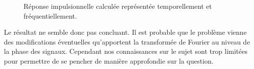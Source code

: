 \begin{figure}[h!]
\caption{\label{bizarre}Réponse impulsionnelle calculée représentée temporellement et fréquentiellement.}
\end{figure}
Le résultat ne semble donc pas concluant. Il est probable que le problème vienne des modifications éventuelles
qu'apportent la transformée de Fourier au niveau de la phase des signaux. Cependant nos connaissances sur le sujet sont
trop limitées pour permettre de se pencher de manière approfondie sur la question.

